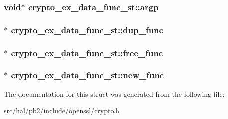 \subsubsection[{\texorpdfstring{argp}{argp}}]{\setlength{\rightskip}{0pt plus 5cm}void$\ast$ crypto\+\_\+ex\+\_\+data\+\_\+func\+\_\+st\+::argp}\hypertarget{structcrypto__ex__data__func__st_a06d5de8bf9d50af5c74088e9ea10c60d}{}\label{structcrypto__ex__data__func__st_a06d5de8bf9d50af5c74088e9ea10c60d}
\subsubsection[{\texorpdfstring{dup\+\_\+func}{dup_func}}]{$\ast$ crypto\+\_\+ex\+\_\+data\+\_\+func\+\_\+st\+::dup\+\_\+func}\hypertarget{structcrypto__ex__data__func__st_a3ba1b7f5fec2a001822f70e5862d72b5}{}\label{structcrypto__ex__data__func__st_a3ba1b7f5fec2a001822f70e5862d72b5}
\subsubsection[{\texorpdfstring{free\+\_\+func}{free_func}}]{$\ast$ crypto\+\_\+ex\+\_\+data\+\_\+func\+\_\+st\+::free\+\_\+func}\hypertarget{structcrypto__ex__data__func__st_acce7bd60712d1319e666f1bd9fbdeabf}{}\label{structcrypto__ex__data__func__st_acce7bd60712d1319e666f1bd9fbdeabf}
\subsubsection[{\texorpdfstring{new\+\_\+func}{new_func}}]{$\ast$ crypto\+\_\+ex\+\_\+data\+\_\+func\+\_\+st\+::new\+\_\+func}\hypertarget{structcrypto__ex__data__func__st_a83923e40c83463bdf292ed628af6db05}{}\label{structcrypto__ex__data__func__st_a83923e40c83463bdf292ed628af6db05}


The documentation for this struct was generated from the following file\+:\begin{DoxyCompactItemize}
\item 
src/hal/pb2/include/openssl/\hyperlink{crypto_8h}{crypto.\+h}\end{DoxyCompactItemize}
